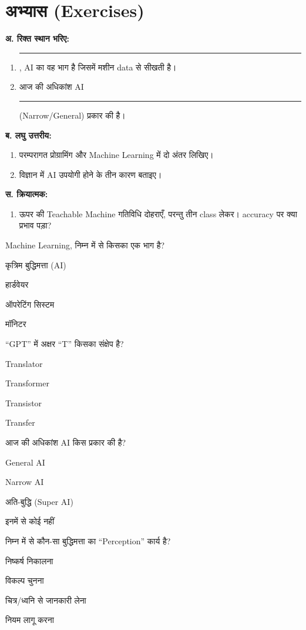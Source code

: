 \section*{अभ्यास (Exercises)}
\textbf{अ. रिक्त स्थान भरिए:}
\begin{enumerate}[leftmargin=1.6em]
  \item \rule{2.5cm}{0.4pt}, AI का वह भाग है जिसमें मशीन data से सीखती है।
  \item आज की अधिकांश AI \rule{2.5cm}{0.4pt} (Narrow/General) प्रकार की है।
\end{enumerate}
\textbf{ब. लघु उत्तरीय:}
\begin{enumerate}[leftmargin=1.6em]
  \item परम्परागत प्रोग्रामिंग और Machine Learning में दो अंतर लिखिए।
  \item विज्ञान में AI उपयोगी होने के तीन कारण बताइए।
\end{enumerate}
\textbf{स. क्रियात्मक:}
\begin{enumerate}[leftmargin=1.6em]
  \item ऊपर की Teachable Machine गतिविधि दोहराएँ, परन्तु तीन class लेकर। accuracy
        पर क्या प्रभाव पड़ा?
\end{enumerate}

\begin{mcq}
  \item Machine Learning, निम्न में से किसका एक भाग है?
    \begin{choices}
      \item कृत्रिम बुद्धिमत्ता (AI) \item हार्डवेयर
      \item ऑपरेटिंग सिस्टम \item मॉनिटर
    \end{choices}
  \item “GPT” में अक्षर “T” किसका संक्षेप है?
    \begin{choices}
      \item Translator \item Transformer \item Transistor \item Transfer
    \end{choices}
  \item आज की अधिकांश AI किस प्रकार की है?
    \begin{choices}
      \item General AI \item Narrow AI
      \item अति-बुद्धि (Super AI) \item इनमें से कोई नहीं
    \end{choices}
  \item निम्न में से कौन-सा बुद्धिमत्ता का “Perception” कार्य है?
    \begin{choices}
      \item निष्कर्ष निकालना \item विकल्प चुनना
      \item चित्र/ध्वनि से जानकारी लेना \item नियम लागू करना
    \end{choices}
\end{mcq}

